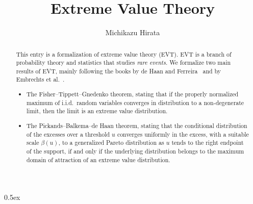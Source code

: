 \documentclass[11pt,a4paper]{article}
\begin{document}
\title{Extreme Value Theory}
\author{Michikazu Hirata}
\maketitle
\begin{abstract}
  This entry is a formalization of extreme value theory (EVT).
  EVT is a branch of probability theory and statistics that studies \emph{rare events}.
  We formalize two main results of EVT, mainly following the books
  by de Haan and Ferreira~\cite{deHaanFerreira}
  and by Embrechts et al.~\cite{EmbrechtsKluppelbergMikosch}.
  \begin{itemize}
  \item The Fisher--Tippett--Gnedenko theorem, stating that
  if the properly normalized maximum of i.i.d.~random variables converges
  in distribution to a non-degenerate limit, then the limit is an extreme value
  distribution.
  \item The Pickands--Balkema--de Haan theorem, stating that
  the conditional distribution of the excesses over a threshold $u$
  converges uniformly in the excess, with a suitable scale $\beta(u)$,
  to a generalized Pareto distribution
  as $u$ tends to the right endpoint of the support,
  if and only if the underlying distribution belongs
  to the maximum domain of attraction of an extreme value distribution.
  \end{itemize}
\end{abstract}

\tableofcontents

\parindent 0pt\parskip 0.5ex





\end{document}
